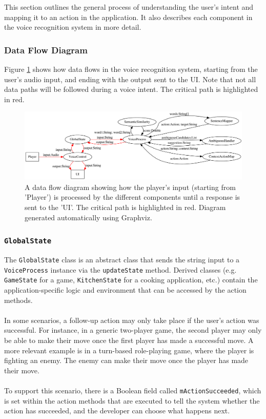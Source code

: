 \documentclass[11pt]{article}
\begin{document}
This section outlines the general process of understanding the user's intent and mapping it to an action in the application. It also describes each component in the voice recognition system in more detail.

\subsubsection{Data Flow Diagram}

Figure \ref{fig:data-flow} shows how data flows in the voice recognition system, starting from the user's audio input, and ending with the output sent to the UI. Note that not all data paths will be followed during a voice intent. The critical path is highlighted in red.

\begin{figure}[H]
\begin{center}
  \includegraphics[width=\linewidth]{data-flow.pdf}
  \caption{A data flow diagram showing how the player's input (starting from 'Player') is processed by the different components until a response is sent to the 'UI'. The critical path is highlighted in red. Diagram generated automatically using Graphviz.}
  \label{fig:data-flow}
  \end{center}
\end{figure}

\subsubsection{\texttt{GlobalState}}

The \texttt{GlobalState} class is an abstract class that sends the string input to a \texttt{VoiceProcess} instance via the \texttt{updateState} method. Derived classes (e.g. \texttt{GameState} for a game, \texttt{KitchenState} for a cooking application, etc.) contain the application-specific logic and environment that can be accessed by the action methods.
\\
\\
In some scenarios, a follow-up action may only take place if the user's action was successful. For instance, in a generic two-player game, the second player may only be able to make their move once the first player has made a successful move. A more relevant example is in a turn-based role-playing game, where the player is fighting an enemy. The enemy can make their move once the player has made their move.
\\
\\
To support this scenario, there is a Boolean field called \texttt{mActionSucceeded}, which is set within the action methods that are executed to tell the system whether the action has succeeded, and the developer can choose what happens next.
\end{document}
